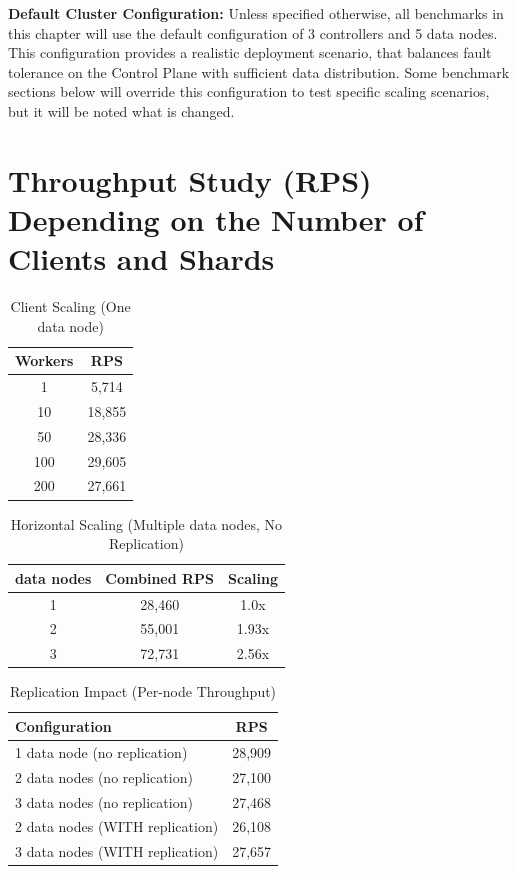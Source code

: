 \documentclass[shortabstract]{iithesis}
\begin{document}
\noindent \textbf{Default Cluster Configuration:} Unless specified otherwise, all benchmarks in this chapter will use the default configuration of 3 controllers and 5 data nodes. This configuration provides a realistic deployment scenario, that balances fault tolerance on the Control Plane with sufficient data distribution. Some benchmark sections below will override this configuration to test specific scaling scenarios, but it will be noted what is changed.

\section{Throughput Study (RPS) Depending on the Number of Clients and Shards}

\begin{table}[h!]
\centering
\caption{Client Scaling (One data node)}
\label{tab:client_scaling}
\begin{tabular}{|c|c|}
\hline
Workers & RPS \\ \hline
1 & 5,714 \\ \hline
10 & 18,855 \\ \hline
50 & 28,336 \\ \hline
100 & 29,605 \\ \hline
200 & 27,661 \\ \hline
\end{tabular}
\end{table}

\begin{table}[h!]
\centering
\caption{Horizontal Scaling (Multiple data nodes, No Replication)}
\label{tab:horizontal_scaling}
\begin{tabular}{|c|c|c|}
\hline
data nodes & Combined RPS & Scaling \\ \hline
1 & 28,460 & 1.0x \\ \hline
2 & 55,001 & 1.93x \\ \hline
3 & 72,731 & 2.56x \\ \hline
\end{tabular}
\end{table}

\begin{table}[h!]
\centering
\caption{Replication Impact (Per-node Throughput)}
\label{tab:replication_impact}
\begin{tabular}{|l|c|}
\hline
Configuration & RPS \\ \hline
1 data node (no replication) & 28,909 \\ \hline
2 data nodes (no replication) & 27,100 \\ \hline
3 data nodes (no replication) & 27,468 \\ \hline
2 data nodes (WITH replication) & 26,108 \\ \hline
3 data nodes (WITH replication) & 27,657 \\ \hline
\end{tabular}
\end{table}
\end{document}
